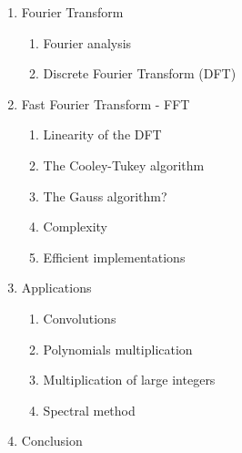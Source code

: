 \documentclass[a4paper]{report}
\begin{document}
\begin{enumerate}
    \item Fourier Transform
    \begin{enumerate}
	\item Fourier analysis
	\item Discrete Fourier Transform (DFT)
    \end{enumerate}
    \item Fast Fourier Transform - FFT
    \begin{enumerate}
	\item Linearity of the DFT
	\item The Cooley-Tukey algorithm
	\item The Gauss algorithm? \cite{Heideman1985}
	\item Complexity
	\item Efficient implementations
    \end{enumerate}
    \item Applications
    \begin{enumerate}
	\item Convolutions
	\item Polynomials multiplication
	\item Multiplication of large integers
	\item Spectral method
    \end{enumerate}
    \item Conclusion
\end{enumerate}




\end{document}
